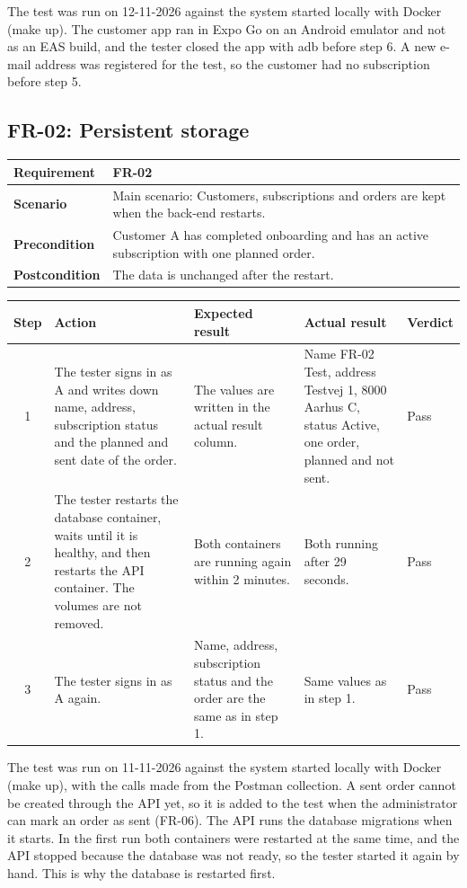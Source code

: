 \documentclass[a4paper,11pt]{article}
\newcommand{\scenarioinfo}[4]{%
  \noindent\begin{tabular}{|p{3cm}|p{12cm}|}
  \hline
  \textbf{Requirement} & \textbf{#1} \\
  \hline
  \textbf{Scenario} & #2 \\
  \hline
  \textbf{Precondition} & #3 \\
  \hline
  \textbf{Postcondition} & #4 \\
  \hline
  \end{tabular}\par\medskip}
\newenvironment{steps}{%
  \noindent\footnotesize
  \begin{tabular}{|c|p{3.6cm}|p{4.6cm}|p{3.2cm}|p{1.5cm}|}
  \hline
  \textbf{Step} & \textbf{Action} & \textbf{Expected result} & \textbf{Actual result} & \textbf{Verdict} \\
  \hline
}{%
  \end{tabular}\par\bigskip
}
\begin{document}
The test was run on 12-11-2026 against the system started locally with Docker (make up). The customer app ran in Expo Go on an Android emulator and not as an EAS build, and the tester closed the app with adb before step 6. A new e-mail address was registered for the test, so the customer had no subscription before step 5.

\subsection{FR-02: Persistent storage}
\scenarioinfo{FR-02}
  {Main scenario: Customers, subscriptions and orders are kept when the back-end restarts.}
  {Customer A has completed onboarding and has an active subscription with one planned order.}
  {The data is unchanged after the restart.}
\begin{steps}
1 & The tester signs in as A and writes down name, address, subscription status and the planned and sent date of the order. & The values are written in the actual result column. & Name FR-02 Test, address Testvej 1, 8000 Aarhus C, status Active, one order, planned and not sent. & Pass \\
\hline
2 & The tester restarts the database container, waits until it is healthy, and then restarts the API container. The volumes are not removed. & Both containers are running again within 2 minutes. & Both running after 29 seconds. & Pass \\
\hline
3 & The tester signs in as A again. & Name, address, subscription status and the order are the same as in step 1. & Same values as in step 1. & Pass \\
\hline
\end{steps}

The test was run on 11-11-2026 against the system started locally with Docker (make up), with the calls made from the Postman collection. A sent order cannot be created through the API yet, so it is added to the test when the administrator can mark an order as sent (FR-06). The API runs the database migrations when it starts. In the first run both containers were restarted at the same time, and the API stopped because the database was not ready, so the tester started it again by hand. This is why the database is restarted first.
\end{document}
